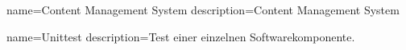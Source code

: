 {
  name=Content Management System
  description={Content Management System}
}

{
  name=Unittest
  description={Test einer einzelnen Softwarekomponente.}
}


